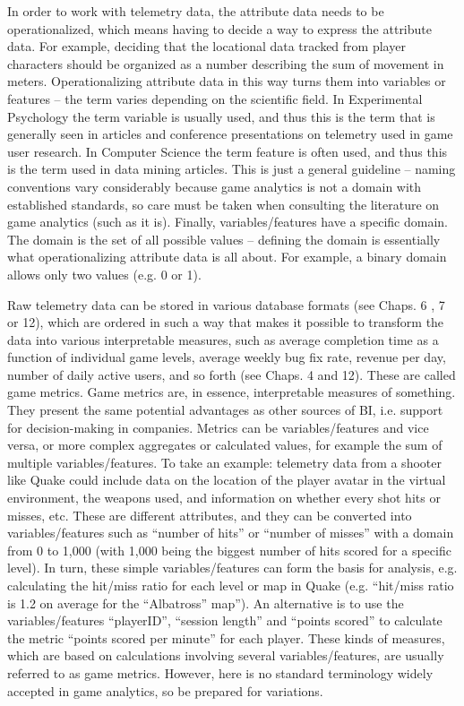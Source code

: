In order to work with telemetry data, the attribute data needs to be operationalized, which means having to decide a way to express the attribute data. For example, deciding that the locational data tracked from player characters should be organized as a number describing the sum of movement in meters. Operationalizing attribute data in this way turns them into variables or features – the term varies depending on the scientific field. In Experimental Psychology the term variable is usually used, and thus this is the term that is generally seen in articles and conference presentations on telemetry used in game user research. In Computer Science the term feature is often used, and thus this is the term used in data mining articles. This is just a general guideline – naming conventions vary considerably because game analytics is not a domain with established standards, so care must be taken when consulting the literature on game analytics (such as it is). Finally, variables/features have a specific domain. The domain is the set of all possible values – defining the domain is essentially what operationalizing attribute data is all about. For example, a binary domain allows only two values (e.g. 0 or 1).

Raw telemetry data can be stored in various database formats (see Chaps. 6 , 7 or 12), which are ordered in such a way that makes it possible to transform the data into various interpretable measures, such as average completion time as a function of individual game levels, average weekly bug fix rate, revenue per day, number of daily active users, and so forth (see Chaps. 4 and 12). These are called game metrics. Game metrics are, in essence, interpretable measures of something. They present the same potential advantages as other sources of BI, i.e. support for decision-making in companies. Metrics can be variables/features and vice versa, or more complex aggregates or calculated values, for example the sum of multiple variables/features. To take an example: telemetry data from a shooter like Quake could include data on the location of the player avatar in the virtual environment, the weapons used, and information on whether every shot hits or misses, etc. These are different attributes, and they can be converted into variables/features such as “number of hits” or “number of misses” with a domain from 0 to 1,000 (with 1,000 being the biggest number of hits scored for a specific level). In turn, these simple variables/features can form the basis for analysis, e.g. calculating the hit/miss ratio for each level or map in Quake (e.g. “hit/miss ratio is 1.2 on average for the “Albatross” map”). An alternative is to use the variables/features “playerID”, “session length” and “points scored” to calculate the metric “points scored per minute” for each player. These kinds of measures, which are based on calculations involving several variables/features, are usually referred to as game metrics. However, here is no standard terminology widely accepted in game analytics, so be prepared for variations.


